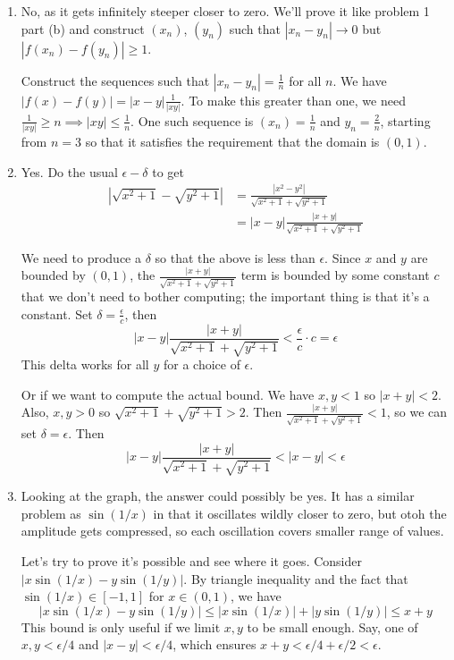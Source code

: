 \documentclass{oxmathproblems}
\begin{document}
\begin{questions}
\begin{solution}
  \begin{enumerate}[label=(\alph*)]
    \item No, as it gets infinitely steeper closer to zero. We'll prove it like problem 1 part (b) and construct $(x_{n})$, $(y_{n})$ such that
    $|x_{n}-y_{n}| \to 0$ but $|f(x_{n})-f(y_{n})| \geq 1$.

    Construct the sequences such that $|x_{n}-y_{n}|=\frac{1}{n}$ for all $n$. We have $|f(x)-f(y)|=|x-y|\frac{1}{|xy|}$. To make this greater than one, we need
    $\frac{1}{|xy|} \geq n \implies |xy| \leq \frac{1}{n}$. One such sequence is $(x_{n})=\frac{1}{n}$ and $y_{n}=\frac{2}{n}$, starting from $n = 3$ so that it
    satisfies the requirement that the domain is $(0, 1)$.

    \item Yes. Do the usual $\epsilon-\delta$ to get
    \begin{align*}
       |\sqrt{x^2+1}-\sqrt{y^2+1}| &= \frac{|x^2-y^2|}{\sqrt{x^2+1}+\sqrt{y^2+1}}\\
       &= |x-y| \frac{|x+y|}{\sqrt{x^2+1}+\sqrt{y^2+1}}
    \end{align*}

    We need to produce a $\delta$ so that the above is less than $\epsilon$. Since $x$ and $y$ are bounded by $(0, 1)$, the $\frac{|x+y|}{\sqrt{x^2+1}+\sqrt{y^2+1}}$ term
    is bounded by some constant $c$ that we don't need to bother computing; the important thing is that it's a constant. Set $\delta=\frac{\epsilon}{c}$, then
    \[|x-y| \frac{|x+y|}{\sqrt{x^2+1}+\sqrt{y^2+1}} < \frac{\epsilon}{c} \cdot c = \epsilon\]
    This delta works for all $y$ for a choice of $\epsilon$.

    Or if we want to compute the actual bound. We have $x, y < 1$ so $|x+y| < 2$. Also, $x, y > 0$ so $\sqrt{x^2+1}+\sqrt{y^2+1} > 2$. Then $\frac{|x+y|}{\sqrt{x^2+1}+\sqrt{y^2+1}} < 1$,
    so we can set $\delta=\epsilon$. Then
    \[|x-y| \frac{|x+y|}{\sqrt{x^2+1}+\sqrt{y^2+1}} < |x-y| < \epsilon\]

    \item Looking at the graph, the answer could possibly be yes. It has a similar problem as $\sin(1/x)$ in that it oscillates wildly closer to zero, but otoh the amplitude gets compressed, so
    each oscillation covers smaller range of values.

    Let's try to prove it's possible and see where it goes. Consider $|x \sin(1/x) - y \sin(1/y)|$. By triangle inequality and the fact that $\sin(1/x) \in [-1, 1]$ for $x \in (0, 1)$, we have
    \[|x \sin(1/x) - y \sin(1/y)| \leq |x \sin(1/x)| + |y \sin(1/y)| \leq x + y\]
    This bound is only useful if we limit $x, y$ to be small enough. Say, one of $x, y < \epsilon/4$ and $|x-y| < \epsilon/4$, which ensures $x+y < \epsilon/4 + \epsilon/2 < \epsilon$.


\end{enumerate}
\end{solution}
\end{questions}
\end{document}
